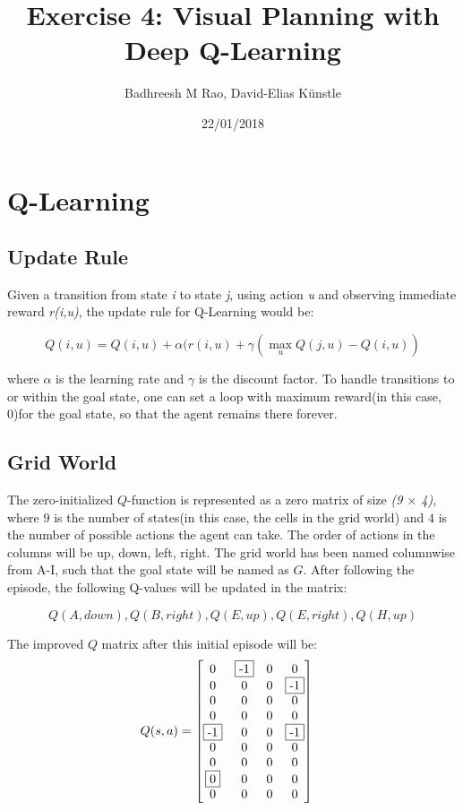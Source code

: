 \documentclass[a4paper,14pt]{article}
\begin{document}
\title{Exercise 4: Visual Planning with Deep Q-Learning}
\author{Badhreesh M Rao, David-Elias K\"unstle}
\date{22/01/2018}
\maketitle
\section{Q-Learning}\label{sec:q-learning}
\subsection{Update Rule}\label{sec:update-rule}
Given a transition from state \textit{i} to state \textit{j}, using action \textit{u} and
observing immediate reward \textit{r(i,u)}, the update rule for Q-Learning would be:

\begin{equation*}
 Q(i,u) = Q(i,u) + \alpha(r(i,u) + \gamma(\max_{u}Q(j,u) - Q(i,u))
\end{equation*} 

where $\alpha$ is the learning rate and $\gamma$ is the discount factor. To handle transitions
to or within the goal state, one can set a loop with maximum reward(in this case, 0)for the goal
state, so that the agent remains there forever.
\subsection{Grid World}\label{sec:grid-world}
The zero-initialized $Q$-function is represented as a zero matrix of size \textit{(9 $\times$ 4)}, 
where $9$ is the number of states(in this case, the cells in the grid world) and $4$ is the
number of possible actions the agent can take. The order of actions in the columns will be up, down, left, right.
The grid world has been named columnwise from A-I, such that the goal state will be named as $G$. After following
the episode, the following Q-values will be updated in the matrix:

\begin{equation*}
 Q(A,down), Q(B,right), Q(E,up), Q(E,right), Q(H,up)
\end{equation*}

The improved $Q$ matrix after this initial episode will be:
$$
Q(s,a)
=
\begin{bmatrix}
0&\fbox{-1}&0&0\\
0&0&0&\fbox{-1}\\
0&0&0&0\\
0&0&0&0\\
\fbox{-1}&0&0&\fbox{-1}\\
0&0&0&0\\
0&0&0&0\\
\fbox{0}&0&0&0\\
0&0&0&0\\
\end{bmatrix}
\quad
$$
\end{document}
